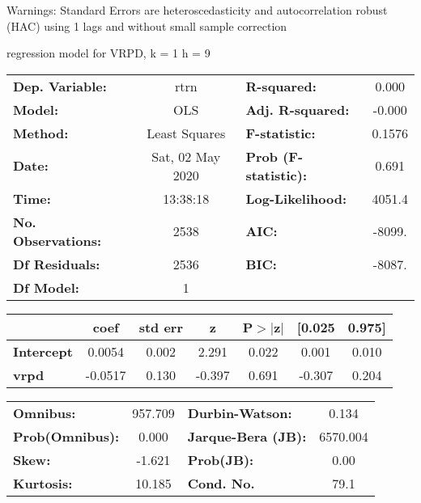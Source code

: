 Warnings: \newline
 [1] Standard Errors are heteroscedasticity and autocorrelation robust (HAC) using 1 lags and without small sample correction\ 

regression model for VRPD, k = 1 h = 9\begin{center}
\begin{tabular}{lclc}
\toprule
\textbf{Dep. Variable:}    &       rtrn       & \textbf{  R-squared:         } &     0.000   \\
\textbf{Model:}            &       OLS        & \textbf{  Adj. R-squared:    } &    -0.000   \\
\textbf{Method:}           &  Least Squares   & \textbf{  F-statistic:       } &    0.1576   \\
\textbf{Date:}             & Sat, 02 May 2020 & \textbf{  Prob (F-statistic):} &    0.691    \\
\textbf{Time:}             &     13:38:18     & \textbf{  Log-Likelihood:    } &    4051.4   \\
\textbf{No. Observations:} &        2538      & \textbf{  AIC:               } &    -8099.   \\
\textbf{Df Residuals:}     &        2536      & \textbf{  BIC:               } &    -8087.   \\
\textbf{Df Model:}         &           1      & \textbf{                     } &             \\
\bottomrule
\end{tabular}
\begin{tabular}{lcccccc}
                   & \textbf{coef} & \textbf{std err} & \textbf{z} & \textbf{P$> |$z$|$} & \textbf{[0.025} & \textbf{0.975]}  \\
\midrule
\textbf{Intercept} &       0.0054  &        0.002     &     2.291  &         0.022        &        0.001    &        0.010     \\
\textbf{vrpd}      &      -0.0517  &        0.130     &    -0.397  &         0.691        &       -0.307    &        0.204     \\
\bottomrule
\end{tabular}
\begin{tabular}{lclc}
\textbf{Omnibus:}       & 957.709 & \textbf{  Durbin-Watson:     } &    0.134  \\
\textbf{Prob(Omnibus):} &   0.000 & \textbf{  Jarque-Bera (JB):  } & 6570.004  \\
\textbf{Skew:}          &  -1.621 & \textbf{  Prob(JB):          } &     0.00  \\
\textbf{Kurtosis:}      &  10.185 & \textbf{  Cond. No.          } &     79.1  \\
\bottomrule
\end{tabular}
\end{center}

